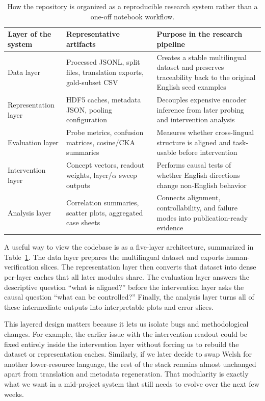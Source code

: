 \documentclass[11pt]{article}
\begin{document}
\begin{table}[t]
\centering
\small
\begin{tabular}{p{}p{}p{}}
\toprule
\textbf{Layer of the system} & \textbf{Representative artifacts} & \textbf{Purpose in the research pipeline} \\
\midrule
Data layer & Processed JSONL, split files, translation exports, gold-subset CSV & Creates a stable multilingual dataset and preserves traceability back to the original English seed examples \\
Representation layer & HDF5 caches, metadata JSON, pooling configuration & Decouples expensive encoder inference from later probing and intervention analysis \\
Evaluation layer & Probe metrics, confusion matrices, cosine/CKA summaries & Measures whether cross-lingual structure is aligned and task-usable before intervention \\
Intervention layer & Concept vectors, readout weights, layer/$\alpha$ sweep outputs & Performs causal tests of whether English directions change non-English behavior \\
Analysis layer & Correlation summaries, scatter plots, aggregated case sheets & Connects alignment, controllability, and failure modes into publication-ready evidence \\
\bottomrule
\end{tabular}
\caption{How the repository is organized as a reproducible research system rather than a one-off notebook workflow.}
\label{tab:arch}
\end{table}

A useful way to view the codebase is as a five-layer architecture, summarized in Table~\ref{tab:arch}. The data layer prepares the multilingual dataset and exports human-verification slices. The representation layer then converts that dataset into dense per-layer caches that all later modules share. The evaluation layer answers the descriptive question ``what is aligned?'' before the intervention layer asks the causal question ``what can be controlled?'' Finally, the analysis layer turns all of these intermediate outputs into interpretable plots and error slices.

This layered design matters because it lets us isolate bugs and methodological changes. For example, the earlier issue with the intervention readout could be fixed entirely inside the intervention layer without forcing us to rebuild the dataset or representation caches. Similarly, if we later decide to swap Welsh for another lower-resource language, the rest of the stack remains almost unchanged apart from translation and metadata regeneration. That modularity is exactly what we want in a mid-project system that still needs to evolve over the next few weeks.
\end{document}
